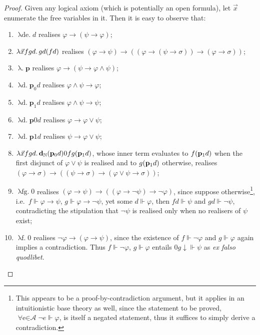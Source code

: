\documentclass[12pt,openany]{book}
\theoremstyle{plain}
\theoremstyle{definition}
\newcommand\uplabel[1]{\textup{(#1)}}
\newcommand\opA[1]{\mathop{\forall #1}}
\newcommand\oplam[1]{\mathop{\lambda #1.}}
\newcommand\bp{\mathbf{p}}
\newcommand\bdN{\mathbf{d}_\mathbb{N}}
\begin{document}
\begin{proof}
  Given any logical axiom (which is potentially an open formula), let $\vec{x}$ enumerate the free variables in it. Then it is easy to observe that:
  \begin{enumerate}[label=\uplabel{\arabic*}]
    \item $\oplam{\vec{x} de} d$ realises $\varphi \rightarrow \left(\psi \rightarrow \varphi\right)$;
    \item $\oplam{\vec{x} fgd} gd \mleft(fd\mright)$ realises $\left(\varphi \rightarrow \psi\right) \rightarrow \left(\left(\varphi \rightarrow \left(\psi \rightarrow \sigma\right)\right) \rightarrow \left(\varphi \rightarrow \sigma\right)\right)$;
    \item $\oplam{\vec{x}} \bp$ realises $\varphi \rightarrow \left(\psi \rightarrow \varphi \land \psi\right)$;
    \item $\oplam{\vec{x} d} \bp_0 d$ realises $\varphi \land \psi \rightarrow \varphi$;
    \item $\oplam{\vec{x} d} \bp_1 d$ realises $\varphi \land \psi \rightarrow \psi$;
    \item $\oplam{\vec{x} d} \bp 0d$ realises $\varphi \rightarrow \varphi \lor \psi$;
    \item $\oplam{\vec{x} d} \bp 1d$ realises $\psi \rightarrow \varphi \lor \psi$;
    \item $\oplam{\vec{x} fgd} \bdN \mleft(\bp_0 d\mright) 0fg \mleft(\bp_1 d\mright)$, whose inner term evaluates to $f \mleft(\bp_1 d\mright)$ when the first disjunct of $\varphi \lor \psi$ is realised and to $g \mleft(\bp_1 d\mright)$ otherwise, realises $\left(\varphi \rightarrow \sigma\right) \rightarrow \left(\left(\psi \rightarrow \sigma\right) \rightarrow \left(\varphi \lor \psi \rightarrow \sigma\right)\right)$;
    \item $\oplam{\vec{x} fg} 0$ realises $\left(\varphi \rightarrow \psi\right) \rightarrow \left(\left(\varphi \rightarrow \neg \psi\right) \rightarrow \neg \varphi\right)$, since suppose otherwise\footnote{This appears to be a proof-by-contradiction argument, but it applies in an intuitionistic base theory as well, since the statement to be proved, $\opA{e \in \mathcal{A}} \neg e \Vdash \varphi$, is itself a negated statement, thus it suffices to simply derive a contradiction.}, i.e.\ $f \Vdash \varphi \rightarrow \psi$, $g \Vdash \varphi \rightarrow \neg \psi$, yet some $d \Vdash \varphi$, then $fd \Vdash \psi$ and $gd \Vdash \neg \psi$, contradicting the stipulation that $\neg \psi$ is realised only when no realisers of $\psi$ exist;
    \item $\oplam{\vec{x} f} 0$ realises $\neg \varphi \rightarrow \left(\varphi \rightarrow \psi\right)$, since the existence of $f \Vdash \neg \varphi$ and $g \Vdash \varphi$ again implies a contradiction. Thus $f \Vdash \neg \varphi$, $g \Vdash \varphi$ entails $0g {\downarrow} \Vdash \psi$ as \emph{ex falso quodlibet}.
          \xdef\intlogicproofquantcount{\number\value{enumi}+1}
  \end{enumerate}


\end{proof}
\end{document}
